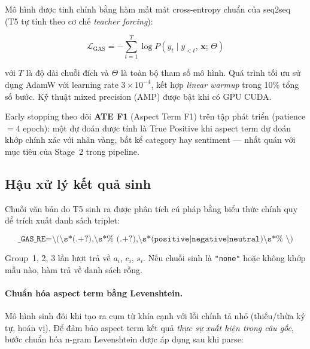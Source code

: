Mô hình được tinh chỉnh bằng hàm mất mát cross-entropy chuẩn của
seq2seq (T5 tự tính theo cơ chế \textit{teacher forcing}):

\begin{equation}
  \mathcal{L}_{\text{GAS}} =
    -\sum_{t=1}^{T} \log P\!\left(y_t \mid y_{<t},\, \mathbf{x};\,
    \Theta\right)
  \label{eq:gas_loss}
\end{equation}

\noindent với $T$ là độ dài chuỗi đích và $\Theta$ là toàn bộ tham số
mô hình.  Quá trình tối ưu sử dụng AdamW với learning rate
$3 \times 10^{-4}$, kết hợp \textit{linear warmup} trong 10\% tổng
số bước.  Kỹ thuật mixed precision (AMP) được bật khi có GPU CUDA.

Early stopping theo dõi \textbf{ATE F1} (Aspect Term F1) trên tập
phát triển (patience$= 4$ epoch): một dự đoán được tính là True
Positive khi aspect term dự đoán khớp chính xác với nhãn vàng, bất
kể category hay sentiment — nhất quán với mục tiêu của Stage~2 trong
pipeline.

\subsection{Hậu xử lý kết quả sinh}
\label{subsec:gas_postprocess}

Chuỗi văn bản do T5 sinh ra được phân tích cú pháp bằng biểu thức
chính quy để trích xuất danh sách triplet:

\begin{equation}
  \texttt{\_GAS\_RE} =
    \texttt{\textbackslash(\textbackslash s*(.+?),\textbackslash s*%
    (.+?),\textbackslash s*(positive|negative|neutral)\textbackslash s*%
    \textbackslash)}
  \label{eq:gas_regex}
\end{equation}

Group~1, 2, 3 lần lượt trả về $a_i$, $c_i$, $s_i$.  Nếu chuỗi sinh
là \texttt{"none"} hoặc không khớp mẫu nào, hàm trả về danh sách
rỗng.

\paragraph{Chuẩn hóa aspect term bằng Levenshtein.}
Mô hình sinh đôi khi tạo ra cụm từ khía cạnh với lỗi chính tả nhỏ
(thiếu/thừa ký tự, hoán vị).  Để đảm bảo aspect term kết quả
\textit{thực sự xuất hiện trong câu gốc}, bước chuẩn hóa n-gram
Levenshtein được áp dụng sau khi parse:

